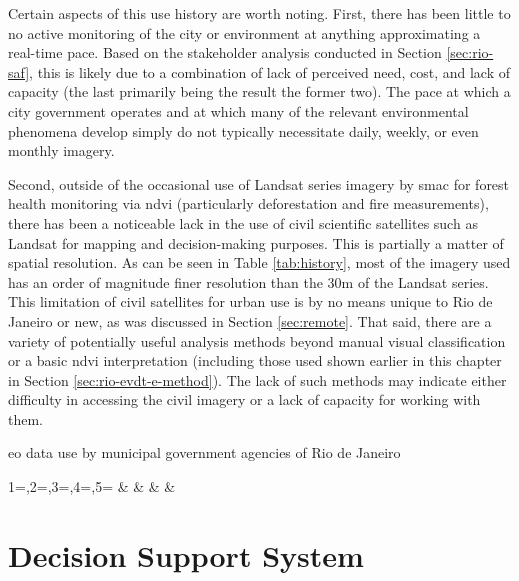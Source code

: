 Certain aspects of this use history are worth noting. First, there has been little to no active monitoring of the city or environment at anything approximating a real-time pace. Based on the stakeholder analysis conducted in Section \ref{sec:rio-saf}, this is likely due to a combination of lack of perceived need, cost, and lack of capacity (the last primarily being the result the former two). The pace at which a city government operates and at which many of the relevant environmental phenomena develop simply do not typically necessitate daily, weekly, or even monthly imagery.

Second, outside of the occasional use of Landsat series imagery by \ac{smac} for forest health monitoring via \ac{ndvi} (particularly deforestation and fire measurements), there has been a noticeable lack in the use of civil scientific satellites such as Landsat for mapping and decision-making purposes. This is partially a matter of spatial resolution. As can be seen in Table \ref{tab:history}, most of the imagery used has an order of magnitude finer resolution than the 30m of the Landsat series. This limitation of civil satellites for urban use is by no means unique to Rio de Janeiro or new, as was discussed in Section \ref{sec:remote}. That said, there are a variety of potentially useful analysis methods beyond manual visual classification or a basic \ac{ndvi} interpretation (including those used shown earlier in this chapter in Section \ref{sec:rio-evdt-e-method}). The lack of such methods may indicate either difficulty in accessing the civil imagery or a lack of capacity for working with them.

\begin{table}[!htb]\centering
	\caption[EO data use by Rio de Janeiro]{\ac{eo} data use by municipal government agencies of Rio de Janeiro}\label{tab:history}
	\fontsize{8}{10}\selectfont
		{1=\year,2=\type,3=\platform,4=\agency,5=\primary}
		{\year & \type & \platform & \agency & \primary}
\end{table}


\section{Decision Support System} \label{sec:rio-dss}

